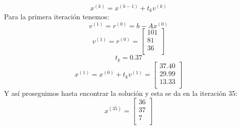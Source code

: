 \begin{frame}
    \begin{equation*}
         x^{(k)}=x^{(k-1)}+t_{k}v^{(k)}
    \end{equation*}
    Para la primera iteración tenemos:
    \begin{equation*}
        v^{(1)}=r^{(0)}=b-Ax^{(0)} 
    \end{equation*}
    \begin{equation*}
        v^{(1)}=r^{(0)}=\begin{bmatrix}
            101  \\
            81  \\
            36  \\
            \end{bmatrix}
    \end{equation*}
    \begin{equation*}
        t_{k}=0.37
    \end{equation*}
    \begin{equation*}
        x^{(1)}=x^{(0)}+t_{k}v^{(1)}=\begin{bmatrix}
            37.40  \\
            29.99  \\
            13.33  \\
            \end{bmatrix}
    \end{equation*}
    Y así proseguimos hasta encontrar la solución y esta se da en la iteración 35:
    \begin{equation*}
        x^{(35)}=\begin{bmatrix}
            36  \\
            37  \\
            7  \\
            \end{bmatrix}
    \end{equation*}
    

       
        
    
         
    
        
        
       
    
   
        \
\end{frame}